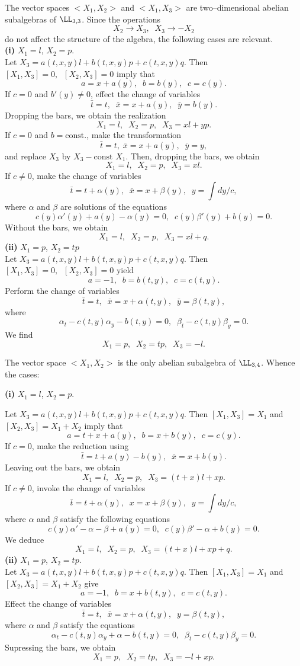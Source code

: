 
The vector spaces $<X_1,X_2>$ and $<X_1,X_3>$ are two--dimensional abelian
subalgebras of
$\LL _{3,3}$. Since the operations
\[ X_2 \longrightarrow X_3,\;\; X_3
\longrightarrow -X_2\]
do not affect the structure of the algebra, the
following cases are relevant.\\ {\bf (i)} $X_1=l$, $X_2=p.$ \\ Let
$X_3=a(t,x,y)l+b(t,x,y)p+c(t,x,y)q$. Then $[X_1,X_3]=0,\;\;[X_2,X_3]=0$
imply that \[a=x+a(y),\;\;b=b(y),\;\;c=c(y).\] If $c=0$ and $b'(y)\ne 0$,
effect the change of variables
\[\bar t=t,\;\; \bar x= x+a(y),\;\;\bar y=b(y).\]
Dropping the bars, we obtain the realization
\[X_1=l,\;\;X_2=p,\;\;X_3=xl+yp.\] If $c=0$ and $ b=\mbox{const.}$, make
the transformation \[\bar t=t,\; \bar x=x+a(y),\;\;\bar y=y,\] and
replace $X_3$ by $X_3-\mbox{const }X_1$. Then, dropping the bars, we
obtain \[X_1=l,\;\;X_2=p,\;\;X_3=xl.\] If $c\ne 0$, make the change of
variables \[\bar t=t+\alpha (y),\;\;\bar x=x+\beta (y),\;\;y=\int dy/c,\]
where $\alpha$ and $\beta$ are solutions of the equations \[c(y)\alpha
'(y)+a(y)-\alpha (y)=0,\;\; c(y)\beta '(y)+b(y)=0.\] Without the bars, we
obtain \[X_1=l,\;\;X_2=p,\;\;X_3=xl+q.\] {\bf (ii)} $X_1=p$, $X_2=tp$\\
Let $X_3=a(t,x,y)l+b(t,x,y)p+c(t,x,y)q$. Then
$[X_1,X_3]=0,\;\;[X_2,X_3]=0$ yield \[a=-1,\;\;b=b(t,y),\;\;c=c(t,y).\]
Perform the change of variables \[\bar t=t,\;\; \bar x=x+\alpha (t,y),\;\;
\bar y =\beta(t,y),\] where \[\alpha_t-c(t,y)\alpha_y-b(t,y)=0,\;\;
\beta_t-c(t,y)\beta_y=0.\]
We find
\[X_1=p,\;\;X_2=tp,\;\;X_3=-l.\]

The vector space $<X_1,X_2>$ is the only abelian subalgebra of $\LL _{3,4}$.
Whence the cases:

{\bf (i)} $X_1=l$, $X_2=p.$ 

Let $X_3=a(t,x,y)l+b(t,x,y)p+c(t,x,y)q$. Then
$[X_1,X_3]=X_1$ and $[X_2,X_3]=X_1+X_2$ imply that
\[a=t+x+a(y),\;\;b=x+b(y),\;\;c=c(y).\]
If $c=0$, make the reduction using
\[\bar t=t+a(y)-b(y),\;\; \bar x=x+b(y).\] 
Leaving out the bars, we obtain
\[X_1=l,\;\;X_2=p,\;\;X_3=(t+x)l+xp.\]
If $c\ne 0$, invoke the change of variables
\[\bar t=t+\alpha (y),\;\;x=x+\beta (y),\;\; y=\int dy/c,\]
where $\alpha$ and $\beta$ satisfy the following equations 
\[c(y)\alpha '-\alpha-\beta+a(y)=0,\;\; c(y)\beta '-\alpha+b(y)=0.\]
We deduce 
\[X_1=l,\;\;X_2=p,\;\;X_3=(t+x)l+xp+q.\]
{\bf (ii)} $X_1=p$, $X_2=tp.$\\
Let $X_3=a(t,x,y)l+b(t,x,y)p+c(t,x,y)q$. Then
$[X_1,X_3]=X_1$ and $[X_2,X_3]=X_1+X_2$ give
\[a=-1,\;\;b=x+b(t,y),\;\;c=c(t,y).\]
Effect the change of variables
\[\bar t=t,\;\;\bar x=x+\alpha (t,y),\;\; y=\beta (t,y),\]
where $\alpha$ and $\beta$ satisfy the equations
\[\alpha_t-c(t,y)\alpha_y+\alpha-b(t,y)=0,\;\; \beta_t-c(t,y)\beta_y=0.\]
Supressing the bars, we obtain \[X_1=p,\;\;X_2=tp,\;\;X_3=-l+xp.\]

